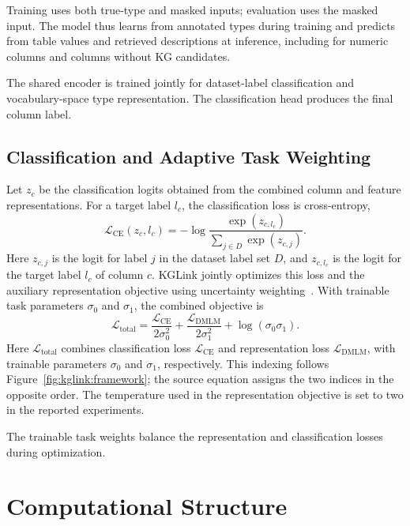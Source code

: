 Training uses both true-type and masked inputs; evaluation uses the masked input. The model thus learns from annotated types during training and predicts from table values and retrieved descriptions at inference, including for numeric columns and columns without KG candidates.

The shared encoder is trained jointly for dataset-label classification and vocabulary-space type representation. The classification head produces the final column label.

\subsection{Classification and Adaptive Task Weighting}
\label{sec:kglink:objective}

Let $z_c$ be the classification logits obtained from the combined column and feature representations. For a target label $l_c$, the classification loss is cross-entropy,
\begin{equation}
\mathcal{L}_{\mathrm{CE}}(z_c,l_c)
 =-\log\frac{\exp(z_{c,l_c})}{\sum_{j\in D}\exp(z_{c,j})}.
\label{eq:kglink:classification}
\end{equation}
Here $z_{c,j}$ is the logit for label $j$ in the dataset label set $D$, and $z_{c,l_c}$ is the logit for the target label $l_c$ of column $c$. KGLink jointly optimizes this loss and the auxiliary representation objective using uncertainty weighting~\cite{kglink-kendall2018multi}. With trainable task parameters $\sigma_0$ and $\sigma_1$, the combined objective is
\begin{equation}
\mathcal{L}_{\mathrm{total}}
 =\frac{\mathcal{L}_{\mathrm{CE}}}{2\sigma_0^2}
  +\frac{\mathcal{L}_{\mathrm{DMLM}}}{2\sigma_1^2}
  +\log(\sigma_0\sigma_1).
\label{eq:kglink:joint-loss}
\end{equation}
Here $\mathcal L_{\mathrm{total}}$ combines classification loss $\mathcal L_{\mathrm{CE}}$ and representation loss $\mathcal L_{\mathrm{DMLM}}$, with trainable parameters $\sigma_0$ and $\sigma_1$, respectively. This indexing follows Figure~\ref{fig:kglink:framework}; the source equation assigns the two indices in the opposite order. The temperature used in the representation objective is set to two in the reported experiments.

The trainable task weights balance the representation and classification losses during optimization.

\section{Computational Structure}
\label{sec:kglink:complexity}

